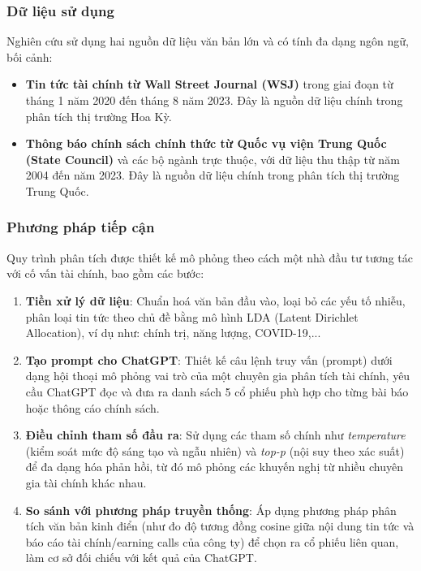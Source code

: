 \documentclass[a4paper,12pt]{article}
\begin{document}
\subsubsection{Dữ liệu sử dụng}
Nghiên cứu sử dụng hai nguồn dữ liệu văn bản lớn và có tính đa dạng ngôn ngữ, bối cảnh:

\begin{itemize}
    \item \textbf{Tin tức tài chính từ Wall Street Journal (WSJ)} trong giai đoạn từ tháng 1 năm 2020 đến tháng 8 năm 2023. Đây là nguồn dữ liệu chính trong phân tích thị trường Hoa Kỳ.
    \item \textbf{Thông báo chính sách chính thức từ Quốc vụ viện Trung Quốc (State Council)} và các bộ ngành trực thuộc, với dữ liệu thu thập từ năm 2004 đến năm 2023. Đây là nguồn dữ liệu chính trong phân tích thị trường Trung Quốc.
\end{itemize}

\subsubsection{Phương pháp tiếp cận}
Quy trình phân tích được thiết kế mô phỏng theo cách một nhà đầu tư tương tác với cố vấn tài chính, bao gồm các bước:

\begin{enumerate}
    \item \textbf{Tiền xử lý dữ liệu}: Chuẩn hoá văn bản đầu vào, loại bỏ các yếu tố nhiễu, phân loại tin tức theo chủ đề bằng mô hình LDA (Latent Dirichlet Allocation), ví dụ như: chính trị, năng lượng, COVID-19,...
    
    \item \textbf{Tạo prompt cho ChatGPT}: Thiết kế câu lệnh truy vấn (prompt) dưới dạng hội thoại mô phỏng vai trò của một chuyên gia phân tích tài chính, yêu cầu ChatGPT đọc và đưa ra danh sách 5 cổ phiếu phù hợp cho từng bài báo hoặc thông cáo chính sách.

    \item \textbf{Điều chỉnh tham số đầu ra}: Sử dụng các tham số chính như \textit{temperature} (kiểm soát mức độ sáng tạo và ngẫu nhiên) và \textit{top-p} (nội suy theo xác suất) để đa dạng hóa phản hồi, từ đó mô phỏng các khuyến nghị từ nhiều chuyên gia tài chính khác nhau.

    \item \textbf{So sánh với phương pháp truyền thống}: Áp dụng phương pháp phân tích văn bản kinh điển (như đo độ tương đồng cosine giữa nội dung tin tức và báo cáo tài chính/earning calls của công ty) để chọn ra cổ phiếu liên quan, làm cơ sở đối chiếu với kết quả của ChatGPT.
\end{enumerate}
\end{document}
